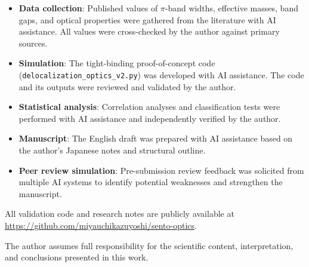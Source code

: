 \documentclass[twocolumn,showpacs,preprintnumbers,amsmath,amssymb,prb]{revtex4-2}
\begin{document}
\begin{itemize}
  \item \textbf{Data collection}: Published values of $\pi$-band
    widths, effective masses, band gaps, and optical properties were
    gathered from the literature with AI assistance. All values were
    cross-checked by the author against primary sources.
  \item \textbf{Simulation}: The tight-binding proof-of-concept code
    (\texttt{delocalization\_optics\_v2.py}) was developed with AI
    assistance. The code and its outputs were reviewed and validated
    by the author.
  \item \textbf{Statistical analysis}: Correlation analyses and
    classification tests were performed with AI assistance and
    independently verified by the author.
  \item \textbf{Manuscript}: The English draft was prepared with AI
    assistance based on the author's Japanese notes and structural
    outline.
  \item \textbf{Peer review simulation}: Pre-submission review
    feedback was solicited from multiple AI systems to identify
    potential weaknesses and strengthen the manuscript.
\end{itemize}

\noindent All validation code and research notes are publicly available
at \url{https://github.com/miyauchikazuyoshi/sento-optics}.

\noindent The author assumes full responsibility for the scientific
content, interpretation, and conclusions presented in this work.


\end{document}
